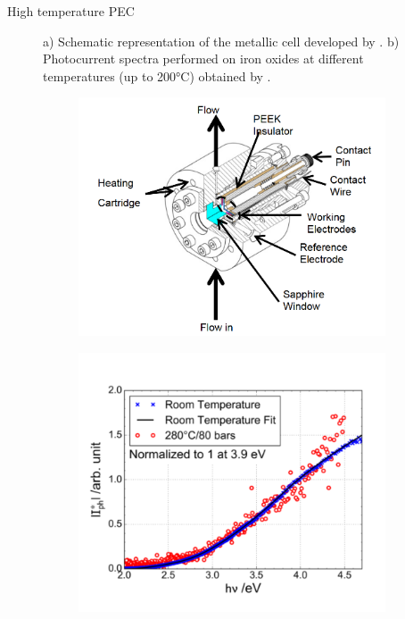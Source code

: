 \documentclass[10pt,compress]{beamer}
\newcommand{\coef}{1}
\begin{document}
\begin{frame}[allowframebreaks=1.0]{High temperature PEC}
\begin{figure}[h]
            \caption{a) Schematic representation of the metallic cell developed
            by \citet{bojinov2002}. 
            b) Photocurrent spectra performed on iron oxides at different 
            temperatures (up to 200°C) obtained by \citet{bojinov2002}.}
            \label{fig_bojinov_ht}
        \end{figure}

        \renewcommand{\coef}{0.45}
        \begin{figure}[h]
            \centering
            \begin{subfigure}{\coef\textwidth}
                \centering
                \includegraphics[width=\textwidth]{./src/figures/skocic2015-1.png}
                \caption{}
                \label{fig_skocic_phd_cell}
            \end{subfigure}
            \begin{subfigure}{\coef\textwidth}
                \centering
                \includegraphics[width=\textwidth]{./src/figures/skocic2015-2.png}
                \caption{}
                \label{fig_skocic_phd_htpec}
            \end{subfigure}
            

\end{figure}
\end{frame}
\end{document}
